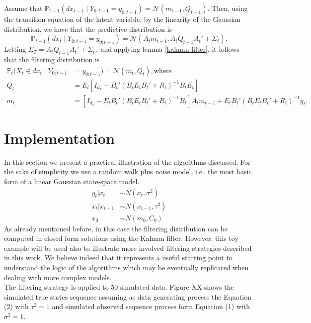 \documentclass[
]{book}
\theoremstyle{break}
\theoremstyle{nonumberplain}
\begin{document}
Assume that
\(\mathbb{P}_{t-1}(dx_{t-1}\mid Y_{0:t-1}=y_{0:t-1})=\mathcal N(m_{t-1},Q_{t-1}).\)
Then, using the transition equation of the latent variable, by the
linearity of the Gaussian distribution, we have that the predictive
distribution is \begin{equation}
\mathbb{P}_{t-1}(dx_{t}\mid Y_{0:t-1}=y_{0:t-1})=\mathcal N(A_tm_{t-1},A_tQ_{t-1}A_t'+\Sigma_t).
\end{equation} Letting \(E_T=A_tQ_{t-1}A_t'+\Sigma_t,\) and applying
lemma \ref{kalman-filter}, it follows that the filtering distribution is
\begin{align*}
  \mathbb{P}_{t}(X_t\in dx_{t}\mid Y_{0:t-1}&=y_{0:t-1})=\mathcal N(m_t,Q_t), \text{where} \\ Q_t&=E_t[I_{d_x} - B_t'(B_tE_tB_t'+R_t)^{-1} B_tE_t] \\
  m_t &= [I_{d_x} - E_tB_t'(B_tE_tB_t'+R_t)^{-1} B_t]A_tm_{t-1}+E_tB_t'(B_tE_tB_t'+R_t)^{-1}y_t.
\end{align*}

\section{Implementation}

In this section we present a practical illustration of the algorithms
discussed. For the sake of simplicity we use a random walk plus noise
model, i.e.~the most basic form of a linear Gaussian state-space
model.\\
\begin{align}
y_{t}|x_{t} & \sim N(x_{t},\sigma^{2}) \\
x_{t}|x_{t-1} & \sim N(x_{t-1},\tau^{2}) \\
x_{0} & \sim N(m_{0},C_{0})
\end{align} As already mentioned before, in this case the filtering
distribution can be computed in closed form solutions using the Kalman
filter. However, this toy example will be used also to illustrate more
involved filtering strategies described in this work. We believe indeed
that it represents a useful starting point to understand the logic of
the algorithms which may be eventually replicated when dealing with more
complex models.\\
The filtering strategy is applied to 50 simulated data. Figure XX shows
the simulated true states sequence assuming as data generating process
the Equation (2) with \(\tau^{2}=1\) and simulated observed sequence
process form Equation (1) with \(\sigma^{2}=1\).
\end{document}
